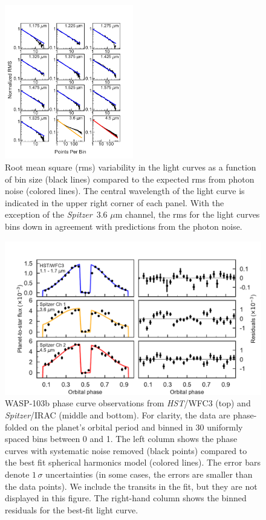 \documentclass[twocolumn]{aastex61}
\newcommand{\project}[1]{\textsl{#1}}
\newcommand{\HST}{\project{HST}}
\newcommand{\Spitzer}{\project{Spitzer}}
\begin{document}
\begin{figure}
\includegraphics[width = 0.5\textwidth]{fig4.pdf}
\caption{Root mean square (rms) variability in the light curves as a function of bin size (black lines) compared to the expected rms from photon noise (colored lines). The central wavelength of the light curve is indicated in the upper right corner of each panel. With the exception of the \Spitzer\ 3.6 $\mu$m channel, the rms for the light curves bins down in agreement with predictions from the photon noise.}
\label{fig:rms}
\end{figure}


\begin{figure}
\includegraphics[width = 1.0\textwidth]{fig5.pdf}
\caption{WASP-103b phase curve observations from \HST/WFC3 (top) and \Spitzer/IRAC (middle and bottom). For clarity, the data are phase-folded on the planet's orbital period and binned in 30 uniformly spaced bins between 0 and 1. The left column shows the phase curves with systematic noise removed (black points) compared to the best fit spherical harmonics model (colored lines). The error bars denote $1\,\sigma$ uncertainties (in some cases, the errors are smaller than the data points).  We include the transits in the fit, but they are not displayed in this figure. The right-hand column shows the binned residuals for the best-fit light curve.}
\label{fig:phasecurves}
\end{figure}
\end{document}
